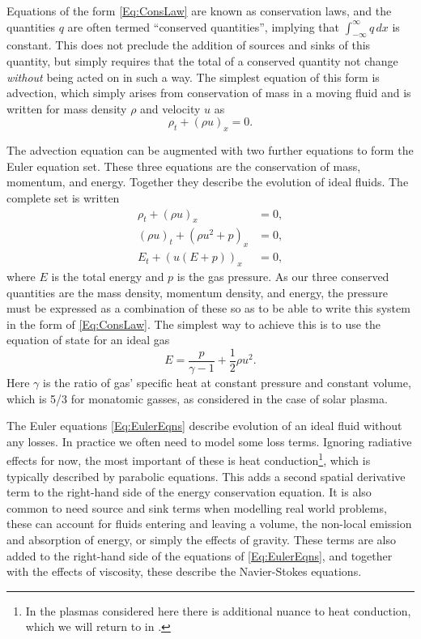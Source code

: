 Equations of the form \eqref{Eq:ConsLaw} are known as conservation laws, and the quantities $q$ are often termed ``conserved quantities'', implying that $\int_{-\infty}^{\infty} q\, dx$ is constant.
This does not preclude the addition of sources and sinks of this quantity, but simply requires that the total of a conserved quantity not change \emph{without} being acted on in such a way.
The simplest equation of this form is advection, which simply arises from conservation of mass in a moving fluid and is written for mass density $\rho$ and velocity $u$ as
\begin{equation}\label{Eq:Advection}
    \rho_t + (\rho u)_x = 0.
\end{equation}

The advection equation can be augmented with two further equations to form the Euler equation set.
These three equations are the conservation of mass, momentum, and energy.
Together they describe the evolution of ideal fluids.
The complete set is written
\begin{equation}\label{Eq:EulerEqns}
\begin{split}
    \rho_t + (\rho u)_x &= 0,\\
    (\rho u)_t + (\rho u^2 + p)_x &= 0,\\
    E_t + (u(E + p))_x &= 0,
\end{split}
\end{equation}
where $E$ is the total energy and $p$ is the gas pressure.
As our three conserved quantities are the mass density, momentum density, and energy, the pressure must be expressed as a combination of these so as to be able to write this system in the form of \eqref{Eq:ConsLaw}.
The simplest way to achieve this is to use the equation of state for an ideal gas
\begin{equation}
    E = \frac{p}{\gamma-1} + \frac{1}{2}\rho u^2.
\end{equation}
Here $\gamma$ is the ratio of gas' specific heat at constant pressure and constant volume, which is 5/3 for monatomic gasses, as considered in the case of solar plasma.

The Euler equations \eqref{Eq:EulerEqns} describe evolution of an ideal fluid without any losses.
In practice we often need to model some loss terms.
Ignoring radiative effects for now, the most important of these is heat conduction\footnote{In the plasmas considered here there is additional nuance to heat conduction, which we will return to in .}, which is typically described by parabolic equations.
This adds a second spatial derivative term to the right-hand side of the energy conservation equation.
It is also common to need source and sink terms when modelling real world problems, these can account for fluids entering and leaving a volume, the non-local emission and absorption of energy, or simply the effects of gravity.
These terms are also added to the right-hand side of the equations of \eqref{Eq:EulerEqns}, and together with the effects of viscosity, these describe the Navier-Stokes equations.

